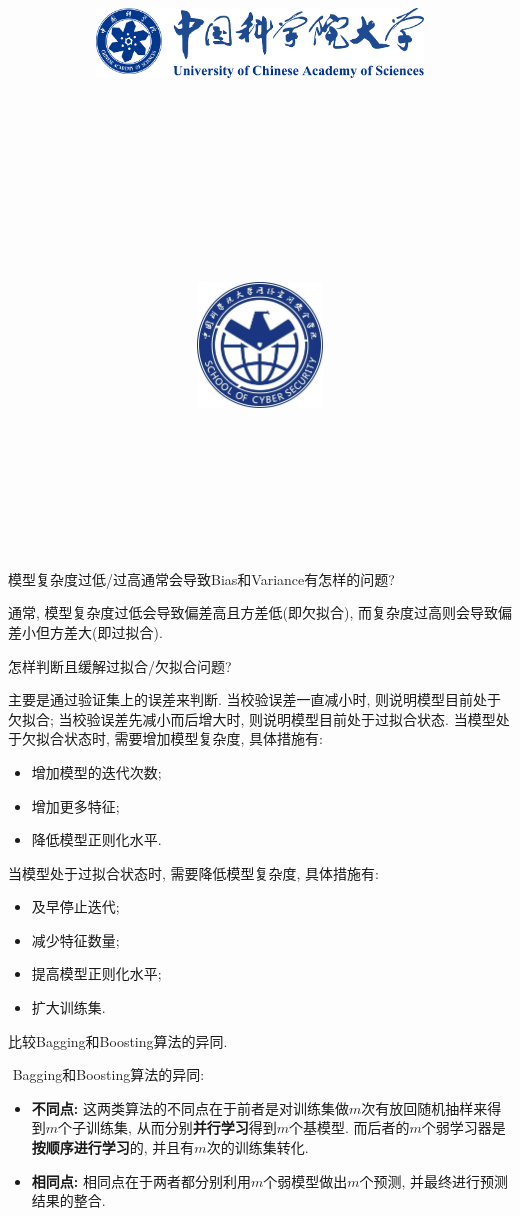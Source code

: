 \documentclass{article}
\title{
	\includegraphics[width=0.65\textwidth]{images/title/ucas_logo 1.pdf}\\
    \vspace{1in}
    \textmd{\textbf{\hmwkClass}}\\
	\textmd{\Large{\textbf{\hmwkClassID}}}\\
    \textmd{\textbf{\hmwkTitle}}\\
    \normalsize\vspace{0.1in}\large{\hmwkCompleteTime }\\
    \vspace{0.1in}\large{\textit{\hmwkClassInstructor\ }}\\
    \vspace{1in}
	\includegraphics[width=0.25\textwidth]{images/title/Cyber.jpg}\\
	\vspace{1in}
}
\author{
	\hmwkAuthorName \\ 
	\hmwkAuthorStuID \\
	\hmwkAuthorInst \\
	\hmwkAuthorzhuanye \\
	\hmwkAuthorfangxiang
	}
\date{}
\begin{document}
\maketitle


%
%
%
%
%


\begin{homeworkProblem}
	模型复杂度过低/过高通常会导致Bias和Variance有怎样的问题?

	\solution 通常, 模型复杂度过低会导致偏差高且方差低(即欠拟合), 而复杂度过高则会导致偏差小但方差大(即过拟合).
\end{homeworkProblem}

\begin{homeworkProblem}
	怎样判断且缓解过拟合/欠拟合问题?

	\solution 主要是通过验证集上的误差来判断. 当校验误差一直减小时, 则说明模型目前处于欠拟合; 当校验误差先减小而后增大时, 则说明模型目前处于过拟合状态. 当模型处于欠拟合状态时, 需要增加模型复杂度, 具体措施有:
	\begin{itemize}
		\item 增加模型的迭代次数;
		\item 增加更多特征;
		\item 降低模型正则化水平.
	\end{itemize}
	当模型处于过拟合状态时, 需要降低模型复杂度, 具体措施有:
	\begin{itemize}
		\item 及早停止迭代;
		\item 减少特征数量;
		\item 提高模型正则化水平;
		\item 扩大训练集.
	\end{itemize}
\end{homeworkProblem}

\begin{homeworkProblem}
	比较Bagging和Boosting算法的异同.

	\solution \,\,Bagging和Boosting算法的异同:
	\begin{itemize}
		\item \textbf{不同点:} 这两类算法的不同点在于前者是对训练集做$m$次有放回随机抽样来得到$m$个子训练集, 从而分别\textbf{并行学习}得到$m$个基模型. 而后者的$m$个弱学习器是\textbf{按顺序进行学习}的, 并且有$m$次的训练集转化.
		\item \textbf{相同点:} 相同点在于两者都分别利用$m$个弱模型做出$m$个预测, 并最终进行预测结果的整合.
	\end{itemize}
\end{homeworkProblem}
\end{document}
